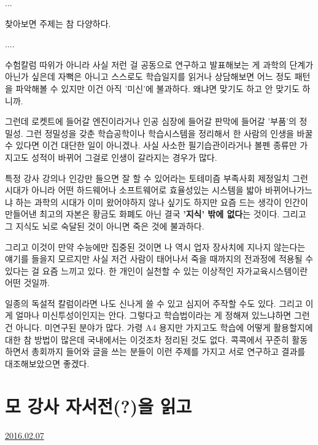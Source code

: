 ...
\vspace{5mm}

찾아보면 주제는 참 다양하다.
\vspace{5mm}

....
\vspace{5mm}

수험칼럼 따위가 아니라 사실 저런 걸 공동으로 연구하고 발표해보는 게 과학의 단계가 아닌가 싶은데
자뻑은 아니고 스스로도 학습일지를 읽거나 상담해보면 어느 정도 패턴을 파악해볼 수 있지만 이건 아직 '미신'에 불과하다.
왜냐면 맞기도 하고 안 맞기도 하니까.
\vspace{5mm}

그런데 로켓트에 들어갈 엔진이라거나 인공 심장에 들어갈 판막에 들어갈 '부품'의 정밀성.
그런 정밀성을 갖춘 학습공학이나 학습시스템을 정리해서 한 사람의 인생을 바꿀 수 있다면 이건 대단한 일이 아니겠나.
사실 사소한 필기습관이라거나 볼펜 종류만 가지고도 성적이 바뀌어 그걸로 인생이 갈라지는 경우가 많다.
\vspace{5mm}

특정 강사 강의나 인강만 들으면 잘 할 수 있어라는 토테미즘 부족사회 제정일치 그런 시대가 아니라
어떤 하드웨어나 소프트웨어로 효율성있는 시스템을 밟아 바뀌어나가느냐 하는 과학의 시대가 이미 왔어야하지 않나 싶기도 하지만
요즘 드는 생각이 인간이 만들어낸 최고의 자본은 황금도 화폐도 아닌 결국 \textbf{'지식' 밖에 없다}는 것이다.
그리고 그 지식도 뇌로 숙달된 것이 아니면 죽은 것에 불과하다.
\vspace{5mm}

그리고 이것이 만약 수능에만 집중된 것이면 나 역시 업자 장사치에 지나지 않는다는 얘기를 들을지 모르지만
사실 저건 사람이 태어나서 죽을 때까지의 전과정에 적용될 수 있다는 걸 요즘 느끼고 있다.
한 개인이 실천할 수 있는 이상적인 자가교육시스템이란 어떤 것일까.
\vspace{5mm}

일종의 독설적 칼럼이라면 나도 신나게 쓸 수 있고 심지어 주작할 수도 있다. 그리고 이게 얼마나 미신투성이인지는 안다.
그렇다고 학습법이라는 게 정해져 있느냐하면 그런 건 아니다. 미연구된 분야가 많다.
가령 A4 용지만 가지고도 학습에 어떻게 활용할지에 대한 참 방법이 많은데 국내에서는 이것조차 정리된 것도 없다.
콕콕에서 꾸준히 활동하면서 총회까지 들어와 글을 쓰는 분들이 이런 주제를 가지고 서로 연구하고 결과를 대조해보았으면 좋겠다.
\vspace{5mm}






\section{모 강사 자서전(?)을 읽고}
\href{https://www.kockoc.com/Apoc/626687}{2016.02.07}

